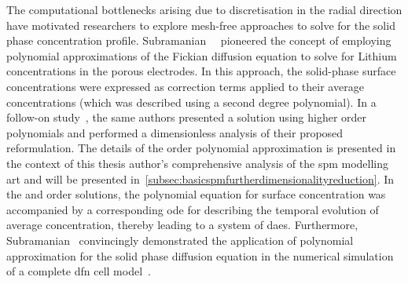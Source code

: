 The   computational   bottlenecks  arising   due   to   discretisation  in   the
radial   direction    have   motivated   researchers   to    explore   mesh-free
approaches   to    solve   for   the   solid    phase   concentration   profile.
Subramanian~\etal~\cite{Subramanian2004}  pioneered  the  concept  of  employing
polynomial approximations of the Fickian diffusion equation to solve for Lithium
concentrations  in the  porous  electrodes. In  this  approach, the  solid-phase
surface  concentrations were  expressed  as correction  terms  applied to  their
average concentrations (which  was described using a  second degree polynomial).
In  a   follow-on  study~\cite{Subramanian2005},  the  same   authors  presented
a  solution  using  higher  order  polynomials  and  performed  a  dimensionless
analysis of  their proposed reformulation.  The details of  the 
order  polynomial approximation  is  presented  in the  context  of this  thesis
author's  comprehensive  analysis  of  the  \gls{spm}  modelling  art  and  will
be  presented  in~\cref{subsec:basicspmfurtherdimensionalityreduction}.  In  the
 and   order solutions, the  polynomial equation
for  surface concentration  was  accompanied by  a  corresponding \gls{ode}  for
describing  the temporal  evolution  of average  concentration, thereby  leading
to  a  system  of  \glspl{dae}.  Furthermore,  Subramanian~\etal{}  convincingly
demonstrated the  application of  polynomial approximation  for the  solid phase
diffusion  equation in  the numerical  simulation of  a complete  \gls{dfn} cell
model~\cite{Subramanian2007}.


